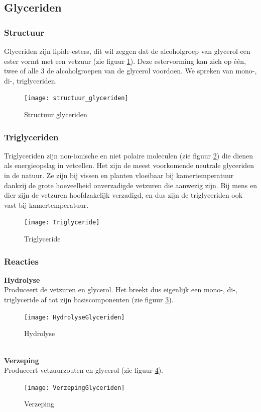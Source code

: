 \documentclass[a4paper,kul]{kulakarticle} %
\begin{document}
\subsection{Glyceriden}
\subsubsection{Structuur}
Glyceriden zijn lipide-esters, dit wil zeggen dat de alcoholgroep van glycerol een ester vormt met een vetzuur (zie figuur \ref{fig:structuurglyceriden}). Deze estervorming kan zich op één, twee of alle 3 de alcoholgroepen van de glycerol voordoen. We spreken van mono-, di-, triglyceriden.
\begin{figure}[h]
	\centering
	\texttt{[image: structuur\_glyceriden]}
	\caption[Structuur glyceriden]{Structuur glyceriden}
	\label{fig:structuurglyceriden}
\end{figure}

\subsubsection{Triglyceriden}
Triglyceriden zijn non-ionische en niet polaire moleculen (zie figuur \ref{fig:triglyceride}) die dienen als energieopslag in vetcellen. Het zijn de meest voorkomende neutrale glyceriden in de natuur. Ze zijn bij vissen en planten vloeibaar bij kamertemperatuur dankzij de grote hoeveelheid onverzadigde vetzuren die aanwezig zijn. Bij mens en dier zijn de vetzuren hoofdzakelijk verzadigd, en dus zijn de triglyceriden ook vast bij kamertemperatuur.
\begin{figure}[h]
	\centering
	\texttt{[image: Triglyceride]}
	\caption[Triglyceride]{Triglyceride}
	\label{fig:triglyceride}
\end{figure}
\subsubsection{Reacties}
\textbf{Hydrolyse}\\
Produceert de vetzuren en glycerol. Het breekt dus eigenlijk een mono-, di-, triglyceride af tot zijn basiscomponenten (zie figuur \ref{fig:hydrolyseglyceriden}).
\begin{figure}[h]
	\centering
	\texttt{[image: HydrolyseGlyceriden]}
	\caption[Hydrolyse]{Hydrolyse}
	\label{fig:hydrolyseglyceriden}
\end{figure}\\
\textbf{Verzeping}\\
Produceert vetzuurzouten en glycerol (zie figuur \ref{fig:verzepingglyceriden}).
\begin{figure}[h]
	\centering
	\texttt{[image: VerzepingGlyceriden]}
	\caption[Verzeping]{Verzeping}
	\label{fig:verzepingglyceriden}
\end{figure}
 \newpage
\end{document}
